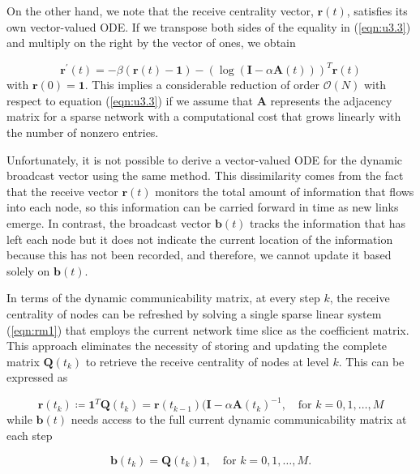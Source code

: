 On the other hand, we note that the receive centrality vector, $\mathbf{r}(t)$, satisfies its own vector-valued ODE. If we transpose both sides of the equality in (\ref{eqn:u3.3}) and multiply on the right by the vector of ones, we obtain

\begin{equation}
\label{eqn:u4.1}
    \mathbf{r^{\prime}}(t) = -\beta (\mathbf{r}(t) - \mathbf{1}) - (\log (\mathbf{I} - \alpha \mathbf{A}(t)))^T\mathbf{r}(t)
\end{equation} with $\mathbf{r}(0)=\mathbf{1}$. This implies a considerable reduction of order $\mathcal{O}(N)$ with respect to equation (\ref{eqn:u3.3}) if we assume that $\mathbf{A}$ represents the adjacency matrix for a sparse network with a computational cost that grows linearly with the number of nonzero entries.

Unfortunately, it is not possible to derive a vector-valued ODE for the dynamic broadcast vector using the same method. This dissimilarity comes from the fact that the receive vector $\mathbf{r}(t)$ monitors the total amount of information that flows into each node, so this information can be carried forward in time as new links emerge. In contrast, the broadcast vector $\mathbf{b}(t)$ tracks the information that has left each node but it does not indicate the current location of the information because this has not been recorded, and therefore, we cannot update it based solely on $\mathbf{b}(t)$. 

\newpage

In terms of the dynamic communicability matrix, at every step $k$, the receive centrality of nodes can be refreshed by solving a single sparse linear system (\ref{eqn:rm1}) that employs the current network time slice as the coefficient matrix. This approach eliminates the necessity of storing and updating the complete matrix $\mathbf{Q}(t_k)$ to retrieve the receive centrality of nodes at level $k$. This can be expressed as

\begin{equation}
\label{eqn:rm1}
    \mathbf{r}(t_k) \coloneqq \mathbf{1}^T \mathbf{Q}(t_k)=\mathbf{r}(t_{k-1})(\mathbf{I}-\alpha \mathbf{A}(t_k)^{-1}, \text{~~~for~} k= 0,1,\dots,M  
\end{equation}
while $\mathbf{b}(t)$ needs access to the full current dynamic communicability matrix at each step

\begin{equation}
\label{eqn:rm2}
    \mathbf{b}(t_k) = \mathbf{Q}(t_k)\mathbf{1}, \text{~~~for~} k= 0,1,\dots,M.  
\end{equation}

